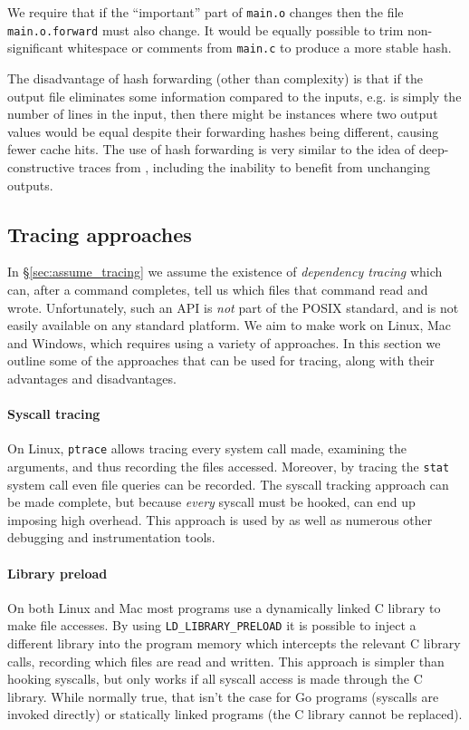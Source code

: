 We require that if the ``important'' part of \texttt{main.o} changes then the file \texttt{main.o.forward} must also change. It would be equally possible to trim non-significant whitespace or comments from \texttt{main.c} to produce a more stable hash.

The disadvantage of hash forwarding (other than complexity) is that if the output file eliminates some information compared to the inputs, e.g. is simply the number of lines in the input, then there might be instances where two output values would be equal despite their forwarding hashes being different, causing fewer cache hits. The use of hash forwarding is very similar to the idea of deep-constructive traces from \citet[\S4.2.4]{build_systems_a_la_carte}, including the inability to benefit from unchanging outputs.


\subsection{Tracing approaches}
\label{sec:tracing}

In \S\ref{sec:assume_tracing} we assume the existence of \emph{dependency tracing} which can, after a command completes, tell us which files that command read and wrote. Unfortunately, such an API is \emph{not} part of the POSIX standard, and is not easily available on any standard platform. We aim to make \Rattle work on Linux, Mac and Windows, which requires using a variety of approaches. In this section we outline some of the approaches that can be used for tracing, along with their advantages and disadvantages.

\paragraph{Syscall tracing} On Linux, \texttt{ptrace} allows tracing every system call made, examining the arguments, and thus recording the files accessed. Moreover, by tracing  the \texttt{stat} system call even file queries can be recorded. The syscall tracking approach can be made complete, but because \emph{every} syscall must be hooked, can end up imposing high overhead. This approach is used by \Bigbro \cite{bigbro} as well as numerous other debugging and instrumentation tools.

\paragraph{Library preload} On both Linux and Mac most programs use a dynamically linked C library to make file accesses. By using \texttt{LD\_LIBRARY\_PRELOAD} it is possible to inject a different library into the program memory which intercepts the relevant C library calls, recording which files are read and written. This approach is simpler than hooking syscalls, but only works if all syscall access is made through the C library. While normally true, that isn't the case for Go programs \cite{go} (syscalls are invoked directly) or statically linked programs (the C library cannot be replaced).

